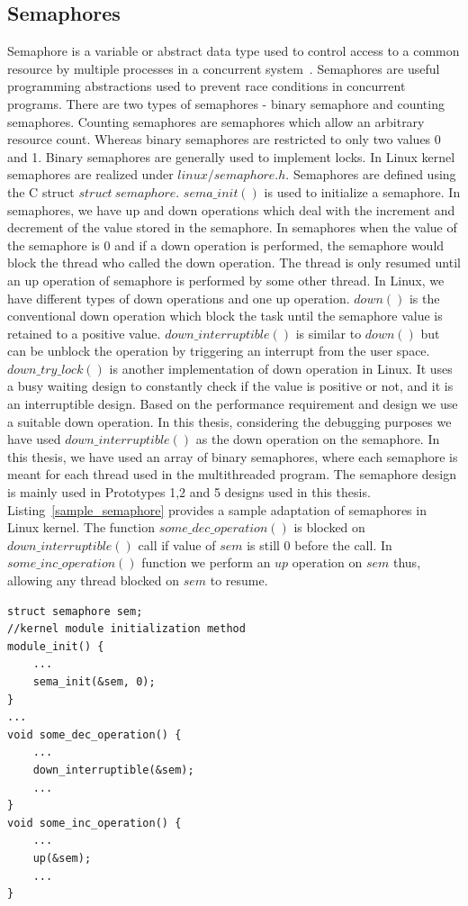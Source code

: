 \subsection{Semaphores}

Semaphore is a variable or abstract data type used to control access to a common resource by multiple processes in a concurrent system~\citep{dijkstra1968cooperating}\citep{dijkstra1968structure}. 
Semaphores are useful programming abstractions used to prevent race conditions in concurrent programs. 
There are two types of semaphores - binary semaphore and counting semaphores. 
Counting semaphores are semaphores which allow an arbitrary resource count. 
Whereas binary semaphores are restricted to only two values 0 and 1. 
Binary semaphores are generally used to implement locks. 
In Linux kernel semaphores are realized under $linux/semaphore.h$. 
Semaphores are defined using the C struct $struct\ semaphore$. 
$sema\_init()$ is used to initialize a semaphore. 
In semaphores, we have up and down operations which deal with the increment and decrement of the value stored in the semaphore. 
In semaphores when the value of the semaphore is 0 and if a down operation is performed, the semaphore would block the thread who called the down operation. 
The thread is only resumed until an up operation of semaphore is performed by some other thread. 
In Linux, we have different types of down operations and one up operation. 
$down()$  is the conventional down operation which block the task until the semaphore value is retained to a positive value. 
$down\_interruptible()$ is similar to $down()$ but can be   unblock the operation by triggering an interrupt from the user space. 
$down\_try\_lock()$ is another implementation of down operation in Linux. 
It uses a busy waiting design to constantly check if the  value is positive or not, and it is an interruptible design. 
Based on the performance requirement and design we use a suitable down operation. 
In this thesis, considering the debugging purposes we have used $down\_interruptible()$ as the down operation on the semaphore. 
In this thesis, we have used an array of binary semaphores, where each semaphore is meant for each thread used in the multithreaded program. 
The semaphore design is mainly used in Prototypes 1,2 and 5 designs used in this thesis. 
Listing~\ref{sample_semaphore} provides a sample adaptation of semaphores in Linux kernel. 
The function $some\_dec\_operation()$ is blocked on $down\_interruptible()$ call if value of $sem$ is still 0 before the call. 
In $some\_inc\_operation()$ function we perform an $up$ operation on $sem$ thus, allowing any thread blocked on $sem$ to resume. 
\begin{lstlisting}[mathescape=true,style=customc,caption={Writing a sample Linux kernel program with semaphores},label={sample_semaphore}]
struct semaphore sem;
//kernel module initialization method
module_init() {
	...
	sema_init(&sem, 0);
}
...
void some_dec_operation() {
	...
	down_interruptible(&sem);	
	...
}
void some_inc_operation() {
	...
	up(&sem);
	...
}

\end{lstlisting}

